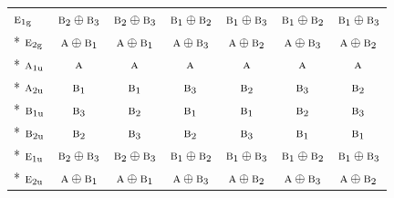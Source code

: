 \documentclass[10pt,a4paper]{article}
\numberwithin{equation}{section}
\newcommand{\irr}[1]{\text{\normalfont\scshape #1}}
\newcommand{\ptag}[1]{\mathrm{#1}}
\begin{document}
{\begin{longtable}{@{}lcccccc@{}}
$\irr{e}_{1\ptag{g}}$ & $\irr{b}_{2}\oplus \irr{b}_{3}$ & $\irr{b}_{2}\oplus \irr{b}_{3}$ & $\irr{b}_{1}\oplus \irr{b}_{2}$ & $\irr{b}_{1}\oplus \irr{b}_{3}$ & $\irr{b}_{1}\oplus \irr{b}_{2}$ & $\irr{b}_{1}\oplus \irr{b}_{3}$\\*
$\irr{e}_{2\ptag{g}}$ & $\irr{a}\oplus \irr{b}_{1}$ & $\irr{a}\oplus \irr{b}_{1}$ & $\irr{a}\oplus \irr{b}_{3}$ & $\irr{a}\oplus \irr{b}_{2}$ & $\irr{a}\oplus \irr{b}_{3}$ & $\irr{a}\oplus \irr{b}_{2}$\\*
$\irr{a}_{1\ptag{u}}$ & $\irr{a}$ & $\irr{a}$ & $\irr{a}$ & $\irr{a}$ & $\irr{a}$ & $\irr{a}$\\*
$\irr{a}_{2\ptag{u}}$ & $\irr{b}_{1}$ & $\irr{b}_{1}$ & $\irr{b}_{3}$ & $\irr{b}_{2}$ & $\irr{b}_{3}$ & $\irr{b}_{2}$\\*
$\irr{b}_{1\ptag{u}}$ & $\irr{b}_{3}$ & $\irr{b}_{2}$ & $\irr{b}_{1}$ & $\irr{b}_{1}$ & $\irr{b}_{2}$ & $\irr{b}_{3}$\\*
$\irr{b}_{2\ptag{u}}$ & $\irr{b}_{2}$ & $\irr{b}_{3}$ & $\irr{b}_{2}$ & $\irr{b}_{3}$ & $\irr{b}_{1}$ & $\irr{b}_{1}$\\*
$\irr{e}_{1\ptag{u}}$ & $\irr{b}_{2}\oplus \irr{b}_{3}$ & $\irr{b}_{2}\oplus \irr{b}_{3}$ & $\irr{b}_{1}\oplus \irr{b}_{2}$ & $\irr{b}_{1}\oplus \irr{b}_{3}$ & $\irr{b}_{1}\oplus \irr{b}_{2}$ & $\irr{b}_{1}\oplus \irr{b}_{3}$\\*
$\irr{e}_{2\ptag{u}}$ & $\irr{a}\oplus \irr{b}_{1}$ & $\irr{a}\oplus \irr{b}_{1}$ & $\irr{a}\oplus \irr{b}_{3}$ & $\irr{a}\oplus \irr{b}_{2}$ & $\irr{a}\oplus \irr{b}_{3}$ & $\irr{a}\oplus \irr{b}_{2}$\\
\bottomrule\end{longtable}}
\end{document}
